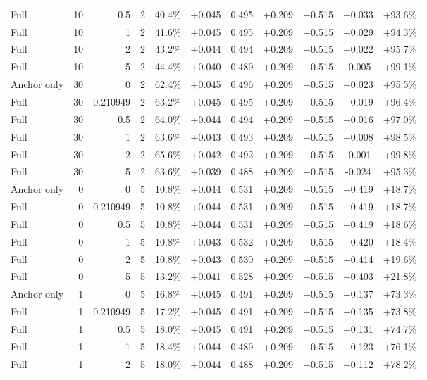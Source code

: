 \begin{table}[htbp]
\begin{tabular}{lrrrccccccc}
Full & 10 & 0.5 & 2 & 40.4\% & +0.045 & 0.495 & +0.209 & +0.515 & +0.033 & +93.6\% \\
Full & 10 & 1 & 2 & 41.6\% & +0.045 & 0.495 & +0.209 & +0.515 & +0.029 & +94.3\% \\
Full & 10 & 2 & 2 & 43.2\% & +0.044 & 0.494 & +0.209 & +0.515 & +0.022 & +95.7\% \\
Full & 10 & 5 & 2 & 44.4\% & +0.040 & 0.489 & +0.209 & +0.515 & -0.005 & +99.1\% \\
Anchor only & 30 & 0 & 2 & 62.4\% & +0.045 & 0.496 & +0.209 & +0.515 & +0.023 & +95.5\% \\
Full & 30 & 0.210949 & 2 & 63.2\% & +0.045 & 0.495 & +0.209 & +0.515 & +0.019 & +96.4\% \\
Full & 30 & 0.5 & 2 & 64.0\% & +0.044 & 0.494 & +0.209 & +0.515 & +0.016 & +97.0\% \\
Full & 30 & 1 & 2 & 63.6\% & +0.043 & 0.493 & +0.209 & +0.515 & +0.008 & +98.5\% \\
Full & 30 & 2 & 2 & 65.6\% & +0.042 & 0.492 & +0.209 & +0.515 & -0.001 & +99.8\% \\
Full & 30 & 5 & 2 & 63.6\% & +0.039 & 0.488 & +0.209 & +0.515 & -0.024 & +95.3\% \\
Anchor only & 0 & 0 & 5 & 10.8\% & +0.044 & 0.531 & +0.209 & +0.515 & +0.419 & +18.7\% \\
Full & 0 & 0.210949 & 5 & 10.8\% & +0.044 & 0.531 & +0.209 & +0.515 & +0.419 & +18.7\% \\
Full & 0 & 0.5 & 5 & 10.8\% & +0.044 & 0.531 & +0.209 & +0.515 & +0.419 & +18.6\% \\
Full & 0 & 1 & 5 & 10.8\% & +0.043 & 0.532 & +0.209 & +0.515 & +0.420 & +18.4\% \\
Full & 0 & 2 & 5 & 10.8\% & +0.043 & 0.530 & +0.209 & +0.515 & +0.414 & +19.6\% \\
Full & 0 & 5 & 5 & 13.2\% & +0.041 & 0.528 & +0.209 & +0.515 & +0.403 & +21.8\% \\
Anchor only & 1 & 0 & 5 & 16.8\% & +0.045 & 0.491 & +0.209 & +0.515 & +0.137 & +73.3\% \\
Full & 1 & 0.210949 & 5 & 17.2\% & +0.045 & 0.491 & +0.209 & +0.515 & +0.135 & +73.8\% \\
Full & 1 & 0.5 & 5 & 18.0\% & +0.045 & 0.491 & +0.209 & +0.515 & +0.131 & +74.7\% \\
Full & 1 & 1 & 5 & 18.4\% & +0.044 & 0.489 & +0.209 & +0.515 & +0.123 & +76.1\% \\
Full & 1 & 2 & 5 & 18.0\% & +0.044 & 0.488 & +0.209 & +0.515 & +0.112 & +78.2\% \\

\end{tabular}
\end{table}
